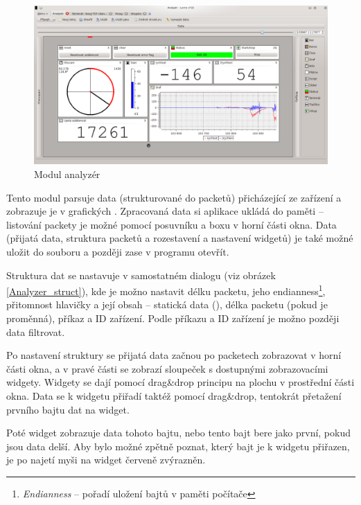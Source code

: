 \documentclass[12pt, a4paper, oneside]{article}
\newcommand{\It}{\textit}  %
\begin{document}
\begin{figure}[h]
\begin{center}
\includegraphics[width=\textwidth]{img/analyzer_all.png}
\caption{Modul analyzér}
\label{Analyzer}
\end{center}
\end{figure}

Tento modul parsuje data (strukturované do packetů) přicházející ze zařízení a zobrazuje je v grafických . Zpracovaná data si aplikace ukládá do paměti -- listování packety je možné pomocí posuvníku a boxu v horní části okna. Data (přijatá data, struktura packetů a rozestavení a nastavení widgetů) je také možné uložit do souboru a později zase v programu otevřít.

Struktura dat se nastavuje v samostatném dialogu (viz obrázek \ref{Analyzer_struct}), kde je možno nastavit délku packetu, jeho endianness\footnote{\It{Endianness} -- pořadí uložení bajtů v paměti počítače}, přitomnost hlavičky a její obsah -- statická data (), délka packetu (pokud je proměnná), příkaz a ID zařízení. Podle příkazu a ID zařízení je možno později data filtrovat.

\newpage
\setlength{\voffset}{0mm} %
\pagestyle{plain}

Po nastavení struktury se přijatá data začnou po packetech zobrazovat v horní části okna, a v pravé části se zobrazí sloupeček s dostupnými zobrazovacími widgety. Widgety se dají pomocí drag\&drop principu  na plochu v prostřední části okna. Data se k widgetu přiřadí taktéž pomocí drag\&drop, tentokrát přetažení prvního bajtu dat na widget. 

Poté widget zobrazuje data tohoto bajtu, nebo tento bajt bere jako první, pokud jsou data delší. Aby bylo možné zpětně poznat, který bajt je k widgetu přiřazen, je po najetí myši na widget červeně zvýrazněn.
\end{document}
